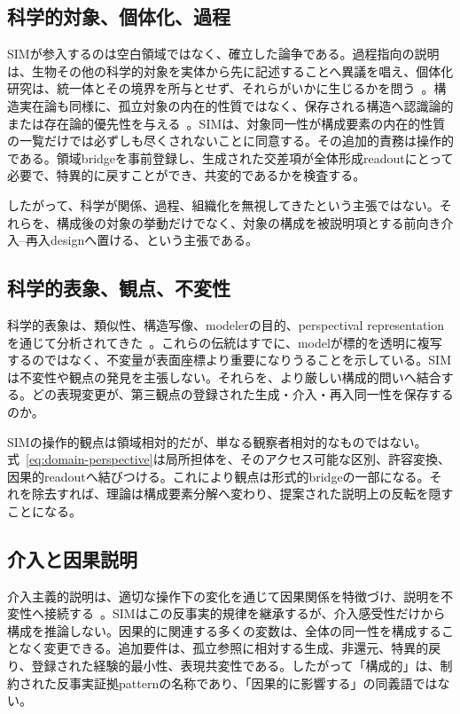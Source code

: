 \documentclass[11pt,a4paper]{article}
\begin{document}
\subsection{科学的対象、個体化、過程}

SIMが参入するのは空白領域ではなく、確立した論争である。過程指向の説明は、生物その他の科学的対象を実体から先に記述することへ異議を唱え、個体化研究は、統一体とその境界を所与とせず、それらがいかに生じるかを問う~\cite{simondon1992,dupre2012,nicholson2018}。構造実在論も同様に、孤立対象の内在的性質ではなく、保存される構造へ認識論的または存在論的優先性を与える~\cite{worrall1989,ladyman1998}。SIMは、対象同一性が構成要素の内在的性質の一覧だけでは必ずしも尽くされないことに同意する。その追加的責務は操作的である。領域bridgeを事前登録し、生成された交差項が全体形成readoutにとって必要で、特異的に戻すことができ、共変的であるかを検査する。

したがって、科学が関係、過程、組織化を無視してきたという主張ではない。それらを、構成後の対象の挙動だけでなく、対象の構成を被説明項とする前向き介入--再入designへ置ける、という主張である。

\subsection{科学的表象、観点、不変性}

科学的表象は、類似性、構造写像、modelerの目的、perspectival representationを通じて分析されてきた~\cite{giere2006,vanfraassen2008,friggnguyen2020}。これらの伝統はすでに、modelが標的を透明に複写するのではなく、不変量が表面座標より重要になりうることを示している。SIMは不変性や観点の発見を主張しない。それらを、より厳しい構成的問いへ結合する。どの表現変更が、第三観点の登録された生成・介入・再入同一性を保存するのか。

SIMの操作的観点は領域相対的だが、単なる観察者相対的なものではない。式~\eqref{eq:domain-perspective}は局所担体を、そのアクセス可能な区別、許容変換、因果的readoutへ結びつける。これにより観点は形式的bridgeの一部になる。それを除去すれば、理論は構成要素分解へ変わり、提案された説明上の反転を隠すことになる。

\subsection{介入と因果説明}

介入主義的説明は、適切な操作下の変化を通じて因果関係を特徴づけ、説明を不変性へ接続する~\cite{pearl2000,woodward2003}。SIMはこの反事実的規律を継承するが、介入感受性だけから構成を推論しない。因果的に関連する多くの変数は、全体の同一性を構成することなく変更できる。追加要件は、孤立参照に相対する生成、非還元、特異的戻り、登録された経験的最小性、表現共変性である。したがって「構成的」は、制約された反事実証拠patternの名称であり、「因果的に影響する」の同義語ではない。
\end{document}
